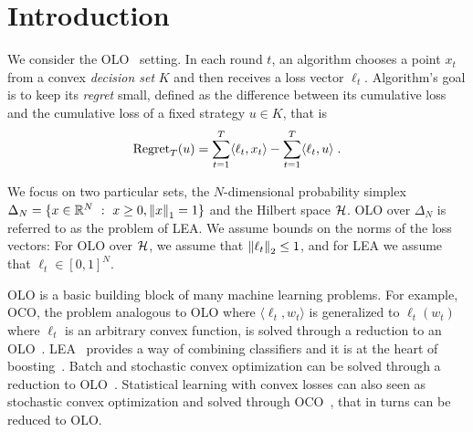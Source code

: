 \section{Introduction}
\label{section:introduction}

We consider the \ac{OLO}~\citep{Cesa-Bianchi-Lugosi-2006,
Shalev-Shwartz-2011} setting. In each round $t$, an algorithm chooses a point
$x_t$ from a convex \emph{decision set} $K$ and then receives a loss vector
$\ell_t$. Algorithm's goal is to keep its \emph{regret} small, defined as the
difference between its cumulative loss and the cumulative loss of a fixed
strategy $u \in K$, that is
$$
\operatorname{Regret}_T(u) = \sum_{t=1}^T \langle \ell_t, x_t \rangle - \sum_{t=1}^T \langle \ell_t, u \rangle \; .
$$

We focus on two particular sets, the $N$-dimensional probability simplex
$\Delta_N = \{ x \in \mathbb{R}^N ~:~ x \ge 0, \left\|{x}\right\|_1 = 1\}$ and the Hilbert space
$\mathcal{H}$.  \ac{OLO} over $\Delta_N$ is referred to as the problem of \ac{LEA}.  We
assume bounds on the norms of the loss vectors: For \ac{OLO} over $\mathcal{H}$, we
assume that $\left\|{\ell_t}\right\|_2 \le 1$, and for \ac{LEA} we assume that
$\ell_t \in [0,1]^N$.

\ac{OLO} is a basic building block of many machine learning problems. For
example, \ac{OCO}, the problem analogous to \ac{OLO} where $\langle \ell_t, w_t \rangle$ is
generalized to $\ell_t(w_t)$ where $\ell_t$ is an arbitrary convex function, is
solved through a reduction to an \ac{OLO}~\citep{Shalev-Shwartz-2011}.
\ac{LEA}~\citep{Littlestone-Warmuth-1994, Vovk-1998,
Cesa-Bianchi-Freund-Haussler-Helmbold-Schapire-Warmuth-1997} provides a way of
combining classifiers and it is at the heart of
boosting~\citep{Freund-Schapire-1997}. Batch and stochastic convex optimization
can be solved through a reduction to \ac{OLO}~\citep{Shalev-Shwartz-2011}.
Statistical learning with convex losses can also seen as stochastic convex
optimization and solved through \ac{OCO}~\citep{Munro-1951}, that in turns can be reduced to \ac{OLO}.

